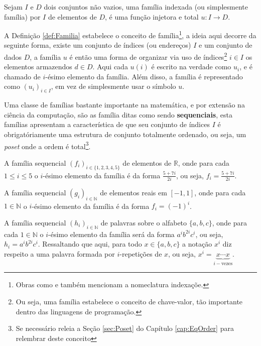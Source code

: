 \begin{definicao}\label{def:Familia}
	Sejam $I$ e $D$ dois conjuntos não vazios, uma família indexada (ou simplesmente família) por $I$ de elementos de $D$, é uma função injetora e total $u: I \rightarrow D$.
\end{definicao}

A Definição \ref{def:Familia} estabelece o conceito de família\footnote{Obras como \cite{halmos2001} e \cite{carmo2013} também mencionam a nomeclatura indexaçõe.}, a ideia aqui decorre da seguinte forma, existe um conjunto de índices (ou endereços) $I$ e um conjunto de dados $D$, a família $u$ é então uma forma de organizar via uso de índices\footnote{Ou seja, uma família estabelece o conceito de chave-valor, tão importante dentro das linguagens de programação.} $i \in I$ os elementos armazendos $d \in D$. Aqui cada $u(i)$ é escrito na verdade como $u_i$, e é chamado de $i$-ésimo elemento da família. Além disso, a família é representado como $(u_i)_{i \in I}$, em vez de simplesmente usar o símbolo $u$. 

Uma classe de famílias bastante importante na matemática, e por extensão na ciência da computação, são as família ditas como sendo \textbf{sequenciais}, esta famílias apresentam a característica de que seu conjunto de índices $I$ é obrigatóriamente uma estrutura de conjunto totalmente ordenado, ou seja, um \textit{poset} onde a ordem é total\footnote{Se necessário releia a Seção \ref{sec:Poset} do Capítulo \ref{cap:EqOrder} para relembrar deste conceito}.

\begin{exemplo}\label{exe:Familia1}
	A família sequencial $(f_i)_{i \in \{1, 2, 3, 4, 5\}}$ de elementos de $\mathbb{R}$, onde para cada $1 \leq i \leq 5$ o $i$-ésimo elemento da família é da forma $\frac{5 + 7i}{2i}$, ou seja, $f_i = \frac{5 + 7i}{2i}$.
\end{exemplo}

\begin{exemplo}\label{exe:Familia2}
	A família sequencial $(g_i)_{i \in \mathbb{N}}$ de elementos reais em $[-1, 1]$, onde para cada $1 \in \mathbb{N}$ o $i$-ésimo elemento da família é da forma $f_i = (-1)^i$.
\end{exemplo}

\begin{exemplo}\label{exe:Familia3}
	A família sequencial $(h_i)_{i \in \mathbb{N}}$ de palavras sobre o alfabeto $\{a, b, c\}$, onde para cada $1 \in \mathbb{N}$ o $i$-ésimo elemento da família será da forma $a^ib^{2i}c^i$, ou seja, $h_i = a^ib^{2i}c^i$. Ressaltando que aqui, para todo $x \in \{a, b, c\}$ a notação $x^i$ diz respeito a uma palavra formada por $i$-repetições de $x$, ou seja, $x^i = \underbrace{x \cdots x}_{i-\text{vezes}}$.
\end{exemplo}

